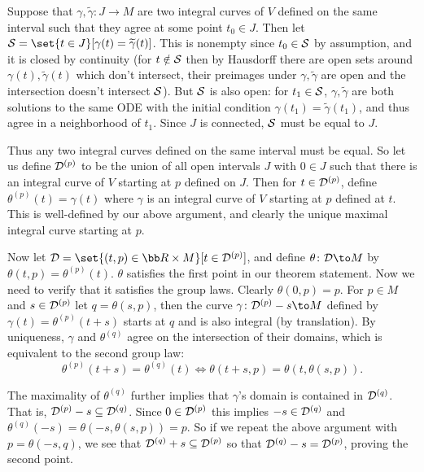 \ethrm

\bproof

    Suppose that $\gamma,\tilde\gamma\colon J\to M$ are two integral curves of $V$ defined on the same interval such that they agree at some point $t_0\in J$.
    Then let $\c S=\set{t\in J}[\gamma(t)=\tilde\gamma(t)]$.
    This is nonempty since $t_0\in{\cal S}$ by assumption, and it is closed by continuity (for $t\notin{\cal S}$ then by Hausdorff there are open sets around
    $\gamma(t),\tilde\gamma(t)$ which don't intersect, their preimages under $\gamma,\tilde\gamma$ are open and the intersection doesn't intersect ${\cal S}$).
    But ${\cal S}$ is also open: for $t_1\in{\cal S}$, $\gamma,\tilde\gamma$ are both solutions to the same ODE with the initial condition $\gamma(t_1)=\tilde\gamma(t_1)$,
    and thus agree in a neighborhood of $t_1$.
    Since $J$ is connected, ${\cal S}$ must be equal to $J$.

    Thus any two integral curves defined on the same interval must be equal.
    So let us define ${{\cal D}}^{(p)}$ to be the union of all open intervals $J$ with $0\in J$ such that there is an integral curve of $V$ starting at $p$ defined on $J$.
    Then for $t\in{{\cal D}}^{(p)}$, define $\theta^{(p)}(t)=\gamma(t)$ where $\gamma$ is an integral curve of $V$ starting at $p$ defined at $t$.
    This is well-defined by our above argument, and clearly the unique maximal integral curve starting at $p$.

    Now let $\D=\set{(t,p)\in\bR\times M}[t\in\D^{(p)}]$, and define $\theta\colon\D\to M$ by $\theta(t,p)=\theta^{(p)}(t)$.
    $\theta$ satisfies the first point in our theorem statement.
    Now we need to verify that it satisfies the group laws.
    Clearly $\theta(0,p)=p$.
    For $p\in M$ and $s\in{{\cal D}}^{(p)}$ let $q=\theta(s,p)$, then the curve $\gamma\colon\D^{(p)}-s\to M$ defined by $\gamma(t)=\theta^{(p)}(t+s)$ starts at $q$
    and is also integral (by translation).
    By uniqueness, $\gamma$ and $\theta^{(q)}$ agree on the intersection of their domains, which is equivalent to the second group law:
    $$ \theta^{(p)}(t+s) = \theta^{(q)}(t) \iff \theta(t+s,p) = \theta(t,\theta(s,p)) . $$

    The maximality of $\theta^{(q)}$ further implies that $\gamma$'s domain is contained in ${{\cal D}}^{(q)}$.
    That is, ${{\cal D}}^{(p)}-s\subseteq{{\cal D}}^{(q)}$.
    Since $0\in{{\cal D}}^{(p)}$ this implies $-s\in{{\cal D}}^{(q)}$ and $\theta^{(q)}(-s)=\theta(-s,\theta(s,p))=p$.
    So if we repeat the above argument with $p=\theta(-s,q)$, we see that ${{\cal D}}^{(q)}+s\subseteq{{\cal D}}^{(p)}$ so that ${{\cal D}}^{(q)}-s={{\cal D}}^{(p)}$, proving the second point.

